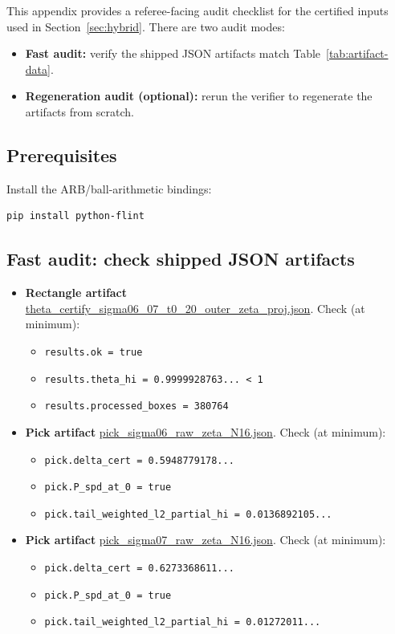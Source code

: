 \documentclass[11pt]{article}
\begin{document}
This appendix provides a referee-facing audit checklist for the certified inputs used in Section~\ref{sec:hybrid}.
There are two audit modes:
\begin{itemize}
\item \textbf{Fast audit:} verify the shipped JSON artifacts match Table~\ref{tab:artifact-data}.
\item \textbf{Regeneration audit (optional):} rerun the verifier to regenerate the artifacts from scratch.
\end{itemize}

\subsection*{Prerequisites}
Install the ARB/ball-arithmetic bindings:
\begin{verbatim}
pip install python-flint
\end{verbatim}

\subsection*{Fast audit: check shipped JSON artifacts}
\begin{itemize}
\item \textbf{Rectangle artifact} \url{theta_certify_sigma06_07_t0_20_outer_zeta_proj.json}. Check (at minimum):
  \begin{itemize}
  \item \texttt{results.ok = true}
  \item \texttt{results.theta\_hi = 0.9999928763... < 1}
  \item \texttt{results.processed\_boxes = 380764}
  \end{itemize}
\item \textbf{Pick artifact} \url{pick_sigma06_raw_zeta_N16.json}. Check (at minimum):
  \begin{itemize}
  \item \texttt{pick.delta\_cert = 0.5948779178...}
  \item \texttt{pick.P\_spd\_at\_0 = true}
  \item \texttt{pick.tail\_weighted\_l2\_partial\_hi = 0.0136892105...}
  \end{itemize}
\item \textbf{Pick artifact} \url{pick_sigma07_raw_zeta_N16.json}. Check (at minimum):
  \begin{itemize}
  \item \texttt{pick.delta\_cert = 0.6273368611...}
  \item \texttt{pick.P\_spd\_at\_0 = true}
  \item \texttt{pick.tail\_weighted\_l2\_partial\_hi = 0.01272011...}
  \end{itemize}
\end{itemize}
\end{document}
